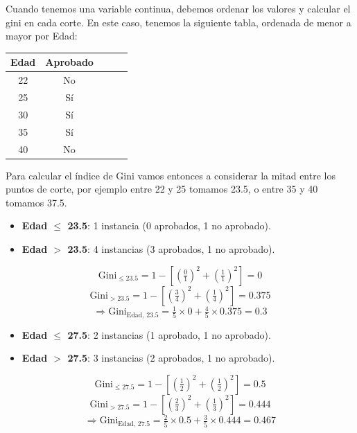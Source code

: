 \documentclass[12pt]{article}
\begin{document}
Cuando tenemos una variable continua, debemos ordenar los valores y calcular el gini en cada corte. En este caso, tenemos la siguiente tabla, ordenada de menor a mayor por Edad:

\begin{table}[h]
  \centering
  \begin{tabular}{ccccc}
    \toprule
    Edad & Aprobado \\
    \midrule
    22 & No \\
    25 & Sí \\
    30 & Sí \\
    35 & Sí \\
    40 & No \\
    \bottomrule
  \end{tabular}
\end{table}

Para calcular el índice de Gini vamos entonces a considerar la mitad entre los puntos de corte, por ejemplo entre 22 y 25 tomamos 23.5, o entre 35 y 40 tomamos 37.5.

\begin{itemize}
  \item \textbf{Edad $\leq$ 23.5}: 1 instancia (0 aprobados, 1 no aprobado).
  \item \textbf{Edad $>$ 23.5}: 4 instancias (3 aprobados, 1 no aprobado).
\end{itemize}

\[
  \mathrm{Gini}_{\leq 23.5} = 1 - \left[\left(\tfrac{0}{1}\right)^2 + \left(\tfrac{1}{1}\right)^2\right] = 0
\]
\[
  \mathrm{Gini}_{> 23.5} = 1 - \left[\left(\tfrac{3}{4}\right)^2 + \left(\tfrac{1}{4}\right)^2\right] = 0.375
\]
\[
  \Rightarrow \mathrm{Gini}_{\text{Edad, 23.5}} = \tfrac{1}{5}\times0 + \tfrac{4}{5}\times0.375 = 0.3
\]

\begin{itemize}
  \item \textbf{Edad $\leq$ 27.5}: 2 instancias (1 aprobado, 1 no aprobado).
  \item \textbf{Edad $>$ 27.5}: 3 instancias (2 aprobados, 1 no aprobado).
\end{itemize}

\[
  \mathrm{Gini}_{\leq 27.5} = 1 - \left[\left(\tfrac{1}{2}\right)^2 + \left(\tfrac{1}{2}\right)^2\right] = 0.5
\]
\[
  \mathrm{Gini}_{> 27.5} = 1 - \left[\left(\tfrac{2}{3}\right)^2 + \left(\tfrac{1}{3}\right)^2\right] = 0.444
\]
\[
  \Rightarrow \mathrm{Gini}_{\text{Edad, 27.5}} = \tfrac{2}{5}\times0.5 + \tfrac{3}{5}\times0.444 = 0.467
\]
\end{document}
